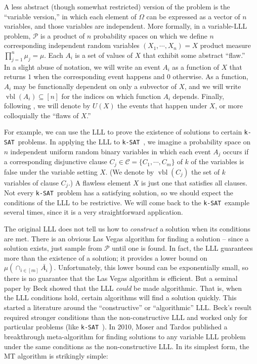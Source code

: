 \documentclass{article}
\newcommand{\ksat}{\texttt{k-SAT}~}
\begin{document}
A less abstract (though somewhat restricted) version of the problem is the ``variable version,'' in which each element of $\Omega$ can be expressed as a vector of $n$ variables, and those variables are independent.  More formally, in a variable-LLL problem, $\mathcal{P}$ is a product of $n$ probability spaces on which we define $n$ corresponding independent random variables $(X_1, \cdots, X_n) = X$ product measure $\prod_{j = 1}^{n} \mu_j  = \mu$.  Each $A_i$ is a set of values of $X$ that exhibit some abstract ``flaw.''  In a slight abuse of notation, we will write an event $A_i$ as a function of $X$ that returns $1$ when the corresponding event happens and $0$ otherwise.  As a function, $A_i$ may be functionally dependent on only a subvector of $X$, and we will write $\operatorname{vbl}(A_i) \subseteq [n]$ for the indices on which function $A_i$ depends.  Finally, following \cite{achlioptas2014random}, we will denote by $U(X)$ the events that happen under $X$, or more colloquially the ``flaws of $X$.''

For example, we can use the LLL to prove the existence of solutions to certain \ksat problems.  In applying the LLL to \ksat, we imagine a probability space on $n$ independent uniform random binary variables in which each event $A_j$ occurs if a corresponding disjunctive clause $C_j \in \mathcal{C} = \{C_1, \cdots, C_m\}$ of $k$ of the variables is false under the variable setting $X$.  (We denote by $\operatorname{vbl}(C_j)$ the set of $k$ variables of clause $C_j$.)  A flawless element $X$ is just one that satisfies all clauses.  Not every \ksat problem has a satisfying solution, so we should expect the conditions of the LLL to be restrictive.  We will come back to the \ksat example several times, since it is a very straightforward application.

The original LLL does not tell us how to \emph{construct} a solution when its conditions are met.  There is an obvious Las Vegas algorithm for finding a solution -- since a solution exists, just sample from $\mathcal{P}$ until one is found.  In fact, the LLL guarantees more than the existence of a solution; it provides a lower bound on $\mu(\cap_{i \in [m]} \bar{A_i})$.  Unfortunately, this lower bound can be exponentially small, so there is no guarantee that the Las Vegas algorithm is efficient.  But a seminal paper by Beck \cite{beck1991algorithmic} showed that the LLL \emph{could} be made algorithmic.  That is, when the LLL conditions hold, certain algorithms will find a solution quickly.  This started a literature around the ``constructive'' or ``algorithmic'' LLL.  Beck's result required stronger conditions than the non-constructive LLL and worked only for particular problems (like \ksat).  In 2010, Moser and Tardos \cite{moser2009constructive,moser2010constructive} published a breakthrough meta-algorithm for finding solutions to any variable LLL problem under the same conditions as the non-constructive LLL.  In its simplest form, the MT algorithm is strikingly simple:
\end{document}
